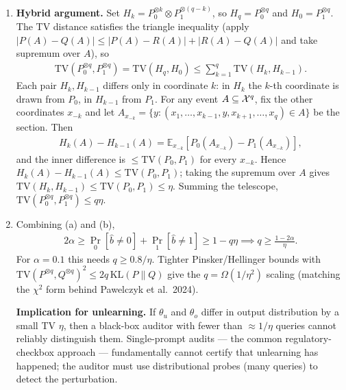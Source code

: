 \documentclass[12pt]{article}
\renewcommand{\fE}{\mathbb{E}}
\begin{document}
\begin{enumerate}
\begin{solution}
\begin{enumerate}
    \item \textbf{Hybrid argument.} Set $H_k = P_0^{\otimes k} \otimes P_1^{\otimes (q-k)}$, so $H_q = P_0^{\otimes q}$ and $H_0 = P_1^{\otimes q}$. The TV distance satisfies the triangle inequality (apply $|P(A) - Q(A)| \le |P(A) - R(A)| + |R(A) - Q(A)|$ and take supremum over $A$), so
    \begin{align*}
        \mathrm{TV}(P_0^{\otimes q}, P_1^{\otimes q}) = \mathrm{TV}(H_q, H_0) \le \sum_{k=1}^q \mathrm{TV}(H_k, H_{k-1}).
    \end{align*}
    Each pair $H_k, H_{k-1}$ differs only in coordinate $k$: in $H_k$ the $k$-th coordinate is drawn from $P_0$, in $H_{k-1}$ from $P_1$. For any event $A \subseteq {\cal X}^q$, fix the other coordinates $x_{-k}$ and let $A_{x_{-k}} = \{y : (x_1, \ldots, x_{k-1}, y, x_{k+1}, \ldots, x_q) \in A\}$ be the section. Then
    \begin{align*}
        H_k(A) - H_{k-1}(A) = \fE_{x_{-k}}\!\left[P_0(A_{x_{-k}}) - P_1(A_{x_{-k}})\right],
    \end{align*}
    and the inner difference is $\le \mathrm{TV}(P_0, P_1)$ for every $x_{-k}$. Hence $H_k(A) - H_{k-1}(A) \le \mathrm{TV}(P_0, P_1)$; taking the supremum over $A$ gives $\mathrm{TV}(H_k, H_{k-1}) \le \mathrm{TV}(P_0, P_1) \le \eta$. Summing the telescope, $\mathrm{TV}(P_0^{\otimes q}, P_1^{\otimes q}) \le q\eta$.

    \item Combining (a) and (b),
    \begin{align*}
        2\alpha \ge \Pr_0[\hat b \ne 0] + \Pr_1[\hat b \ne 1] \ge 1 - q\eta \implies q \ge \frac{1 - 2\alpha}{\eta}.
    \end{align*}
    For $\alpha = 0.1$ this needs $q \ge 0.8/\eta$. Tighter Pinsker/Hellinger bounds with $\mathrm{TV}(P^{\otimes q}, Q^{\otimes q})^2 \le 2q\,\mathrm{KL}(P\|Q)$ give the $q = \Omega(1/\eta^2)$ scaling (matching the $\chi^2$ form behind Pawelczyk et al.\ 2024).

    \textbf{Implication for unlearning.} If $\theta_u$ and $\theta_o$ differ in output distribution by a small TV $\eta$, then a black-box auditor with fewer than $\approx 1/\eta$ queries cannot reliably distinguish them. Single-prompt audits --- the common regulatory-checkbox approach --- fundamentally cannot certify that unlearning has happened; the auditor must use distributional probes (many queries) to detect the perturbation.
\end{enumerate}
\end{solution}

\end{enumerate}
\end{document}
